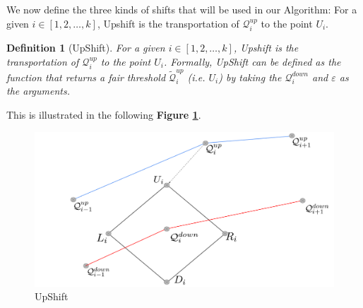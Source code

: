 \documentclass{article}
\newtheorem{definition}{Definition}[section]
\begin{document}
We now define the three kinds of shifts that will be used in our Algorithm:
For a given $ i \in [1 , 2, \hdots ,k]$, Upshift is the transportation of $\mathcal{Q}_i^{up}$ to the point $U_i$. 
\begin{definition}[UpShift] \label{def:csh}
    For a given $ i \in [1 , 2, \hdots ,k]$, Upshift is the transportation of $\mathcal{Q}_i^{up}$ to the point $U_i$. Formally, \emph{UpShift} can be defined as the function that returns a fair threshold $\widetilde{\mathcal{Q}}_i^{up}$ (i.e. $U_i$) by taking the $\mathcal{Q}_i^{down}$ and $\varepsilon$ as the arguments.
\end{definition}
This is illustrated in the following \textbf{Figure \ref{fig:US}}.
\begin{figure}[!h]
    \centering
    \includegraphics[scale = 0.35]{diagrams/UpShift_updated.png}
    \caption{UpShift}
    \label{fig:US}
\end{figure}
\end{document}
